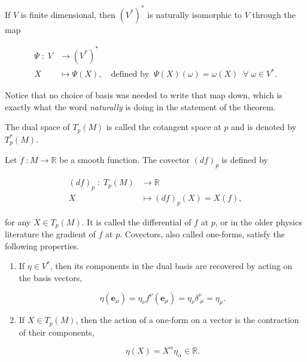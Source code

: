         \begin{myteo}
            If $V$ is finite dimensional, then $(V^*)^*$ is naturally isomorphic to $V$ through the map

            \begin{equation}
                \begin{split}
                    \Psi\;:\;V &\longrightarrow (V^*)^*\\
                    X &\longmapsto \Psi(X), \quad \text{defined by}\;\; \Psi(X)(\omega) = \omega(X) \;\;\forall\;\omega \in V^*.
                \end{split}
            \end{equation}
        \end{myteo}

        Notice that no choice of basis was needed to write that map down, which is exactly what the word \textit{naturally} is doing in the statement of the theorem.

        \begin{myDef}
            The dual space of $T_p(M)$ is called the cotangent space at $p$ and is denoted by $T_p^*(M)$.
        \end{myDef}

        \begin{myDef}
            Let $f\;:M \rightarrow \mathbb{R}$ be a smooth function. The covector $(df)_p$ is defined by

            \begin{equation}
                \begin{split}
                    (df)_p\;:\;T_p(M) &\longrightarrow \mathbb{R}\\
                    X &\longmapsto (df)_p(X) = X(f),
                \end{split}
            \end{equation}

            for any $X \in T_p(M)$. It is called the differential of $f$ at $p$, or in the older physics literature the gradient of $f$ at $p$. Covectors, also called one-forms, satisfy the following properties.

            \begin{enumerate}
                \item If $\eta \in V^*$, then its components in the dual basis are recovered by acting on the basis vectors,

                \begin{equation}
                    \eta(\mathbf{e}_{\mu}) = \eta_{\nu}f^{\nu}(\mathbf{e}_{\mu}) = \eta_{\nu}\delta^{\nu}_{\;\mu} = \eta_{\mu}.
                \end{equation}

                \item If $X \in T_p(M)$, then the action of a one-form on a vector is the contraction of their components,

                \begin{equation}
                    \eta(X) = X^{\alpha}\eta_{\alpha} \in \mathbb{R}.
                \end{equation}
            \end{enumerate}
        \end{myDef}

